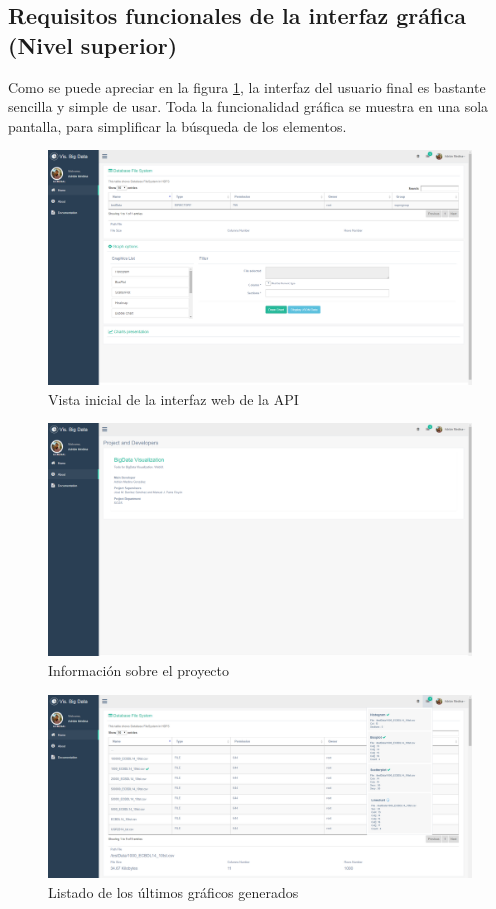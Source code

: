 \subsection{Requisitos funcionales de la interfaz gráfica (Nivel superior)}
Como se puede apreciar en la figura \ref{fig:interfazinicial}, la interfaz del usuario final es bastante sencilla y simple de usar. Toda la funcionalidad gráfica se muestra en una sola pantalla, para simplificar la búsqueda de los elementos.
\begin{figure}
	\centering
	\includegraphics[width=1\linewidth]{imagenes/interfaz_inicial}
	\caption{Vista inicial de la interfaz web de la API}
	\label{fig:interfazinicial}
\end{figure}
\begin{figure}
	\centering
	\includegraphics[width=1\linewidth]{imagenes/boton_about}
	\caption{Información sobre el proyecto}
	\label{fig:botonabout}
\end{figure}
\begin{figure}
	\centering
	\includegraphics[width=1\linewidth]{imagenes/lista_ultimos_graficos}
	\caption{Listado de los últimos gráficos generados}
	\label{fig:listaultimosgraficos}
\end{figure}

